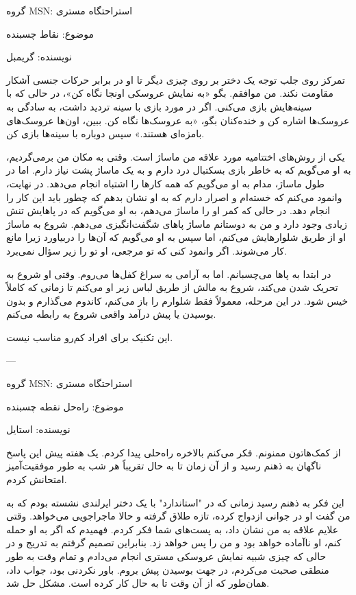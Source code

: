
گروه MSN: استراحتگاه مستری

موضوع: نقاط چسبنده

نویسنده: گریمبل

تمرکز روی جلب توجه یک دختر بر روی چیزی دیگر تا او در برابر حرکات جنسی آشکار مقاومت نکند. من موافقم. بگو «به نمایش عروسکی اونجا نگاه کن»، در حالی که با سینه‌هایش بازی می‌کنی. اگر در مورد بازی با سینه تردید داشت، به سادگی به عروسک‌ها اشاره کن و خنده‌کنان بگو، «به عروسک‌ها نگاه کن. ببین، اون‌ها عروسک‌های بامزه‌ای هستند.» سپس دوباره با سینه‌ها بازی کن.

یکی از روش‌های اختتامیه مورد علاقه من ماساژ است. وقتی به مکان من برمی‌گردیم، به او می‌گویم که به خاطر بازی بسکتبال درد دارم و به یک ماساژ پشت نیاز دارم. اما در طول ماساژ، مدام به او می‌گویم که همه کارها را اشتباه انجام می‌دهد. در نهایت، وانمود می‌کنم که خسته‌ام و اصرار دارم که به او نشان بدهم که چطور باید این کار را انجام دهد. در حالی که کمر او را ماساژ می‌دهم، به او می‌گویم که در پاهایش تنش زیادی وجود دارد و من به دوستانم ماساژ پاهای شگفت‌انگیزی می‌دهم. شروع به ماساژ او از طریق شلوارهایش می‌کنم، اما سپس به او می‌گویم که آن‌ها را دربیاورد زیرا مانع کار می‌شوند. اگر وانمود کنی که تو مرجعی، او تو را زیر سؤال نمی‌برد.

در ابتدا به پاها می‌چسبانم. اما به آرامی به سراغ کفل‌ها می‌روم. وقتی او شروع به تحریک شدن می‌کند، شروع به مالش از طریق لباس زیر او می‌کنم تا زمانی که کاملاً خیس شود. در این مرحله، معمولاً فقط شلوارم را باز می‌کنم، کاندوم می‌گذارم و بدون بوسیدن یا پیش درآمد واقعی شروع به رابطه می‌کنم.

این تکنیک برای افراد کم‌رو مناسب نیست.

---

گروه MSN: استراحتگاه مستری

موضوع: راه‌حل نقطه چسبنده

نویسنده: استایل

از کمک‌هاتون ممنونم. فکر می‌کنم بالاخره راه‌حلی پیدا کردم. یک هفته پیش این پاسخ ناگهان به ذهنم رسید و از آن زمان تا به حال تقریباً هر شب به طور موفقیت‌آمیز امتحانش کردم.

این فکر به ذهنم رسید زمانی که در "استاندارد" با یک دختر ایرلندی نشسته بودم که به من گفت او در جوانی ازدواج کرده، تازه طلاق گرفته و حالا ماجراجویی می‌خواهد. وقتی علایم علاقه به من نشان داد، به پست‌های شما فکر کردم. فهمیدم که اگر به او حمله کنم، او ناآماده خواهد بود و من را پس خواهد زد. بنابراین تصمیم گرفتم به تدریج و در حالی که چیزی شبیه نمایش عروسکی مستری انجام می‌دادم و تمام وقت به طور منطقی صحبت می‌کردم، در جهت بوسیدن پیش بروم. باور نکردنی بود، جواب داد، همان‌طور که از آن وقت تا به حال کار کرده است. مشکل حل شد.


